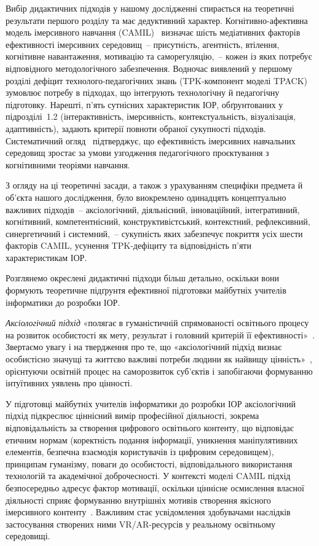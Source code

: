 Вибір дидактичних підходів у нашому дослідженні спирається на теоретичні результати першого розділу та має дедуктивний характер. Когнітивно-афективна модель імерсивного навчання (CAMIL)~\cite{Makransky2021CAMIL} визначає шість медіативних факторів ефективності імерсивних середовищ~-- присутність, агентність, втілення, когнітивне навантаження, мотивацію та саморегуляцію,~-- кожен із яких потребує відповідного методологічного забезпечення. Водночас виявлений у першому розділі дефіцит технолого-педагогічних знань (TPK-компонент моделі TPACK)~\cite{Gurevych2015Integration} зумовлює потребу в підходах, що інтегрують технологічну й педагогічну підготовку. Нарешті, п'ять сутнісних характеристик ІОР, обґрунтованих у підрозділі~1.2 (інтерактивність, імерсивність, контекстуальність, візуалізація, адаптивність), задають критерії повноти обраної сукупності підходів. Систематичний огляд~\cite{Mallek2024SynthesizingVR} підтверджує, що ефективність імерсивних навчальних середовищ зростає за умови узгодження педагогічного проєктування з когнітивними теоріями навчання.

З огляду на ці теоретичні засади, а також з урахуванням специфіки предмета й об'єкта нашого дослідження, було виокремлено одинадцять концептуально важливих підходів~-- аксіологічний, діяльнісний, інноваційний, інтегративний, когнітивний, компетентнісний, конструктивістський, контекстний, рефлексивний, синергетичний і системний,~-- сукупність яких забезпечує покриття усіх шести факторів CAMIL, усунення TPK-дефіциту та відповідність п'яти характеристикам ІОР.

Розглянемо окреслені дидактичні підходи більш детально, оскільки вони формують теоретичне підґрунтя ефективної підготовки майбутніх учителів інформатики до розробки ІОР.

\emph{Аксіологічний підхід} «полягає в гуманістичній спрямованості освітнього процесу на розвиток особистості як мету, результат і головний критерій її ефективності»~\cite{Kremen2016Axiological}. Звертаємо увагу і на твердження про те, що «аксіологічний підхід визнає особистісно значущі та життєво важливі потреби людини як найвищу цінність»~\cite[c.~49]{Kuzminskyi2012Pedagogy}, орієнтуючи освітній процес на саморозвиток суб'єктів і запобігаючи формуванню інтуїтивних уявлень про цінності.

У підготовці майбутніх учителів інформатики до розробки ІОР аксіологічний підхід підкреслює ціннісний вимір професійної діяльності, зокрема відповідальність за створення цифрового освітнього контенту, що відповідає етичним нормам (коректність подання інформації, уникнення маніпулятивних елементів, безпечна взаємодія користувачів із цифровим середовищем), принципам гуманізму, поваги до особистості, відповідального використання технологій та академічної доброчесності. У контексті моделі CAMIL підхід безпосередньо адресує фактор мотивації, оскільки ціннісне осмислення власної діяльності сприяє формуванню внутрішніх мотивів створення якісного імерсивного контенту~\cite{Lee2022VRMaking}. Важливим стає усвідомлення здобувачами наслідків застосування створених ними VR/AR-ресурсів у реальному освітньому середовищі.


